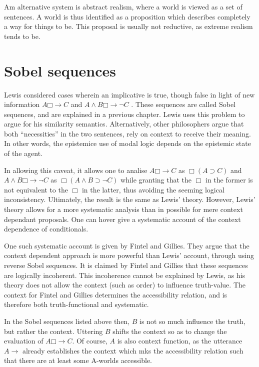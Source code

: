\documentclass[12pt]{report}
\newcommand{\would}{{\mathbin{\Box}{\rightarrow}}}
\begin{document}
Am alternative system is abstract realism, where a world is viewed as a set of
sentences. A world is thus identified as a proposition which describes
completely a way for things to be. This proposal is usually not reductive, as
extreme realism tends to be.

\section{Sobel sequences}

Lewis considered cases wherein an implicative is true, though false in light of
new information $A \would C$ and $A \land B \would \lnot C$ . These sequences
are called Sobel sequences, and are explained in a previous chapter. Lewis uses
this problem to argue for his similarity semantics. Alternatively, other
philosophers argue that both ``necessities'' in the two sentences, rely on
context to receive their meaning. In other words, the epistemice use of modal
logic depends on the epistemic state of the agent.

In allowing this caveat, it allows one to analise $A \would C$ as $\Box (A
\supset C)$ and  $A \land B \would \lnot C$ as $\Box (A \land B \supset \lnot
C)$ while granting that the $\Box$ in the former is not equivalent to the $\Box$
in the latter, thus avoiding the seeming logical inconsistency. Ultimately, the
result is the same as Lewis' theory. However, Lewis' theory allows for a more
systematic analysis than in possible for mere context dependant proposals. One
can hover give a systematic account of the context dependence of conditionals.

One such systematic account is given by Fintel and Gillies. They argue that the
context dependent approach is more powerful than Lewis' account, through using
reverse Sobel sequences. It is claimed by Fintel and Gillies that these
sequences are logically incoherent. This incoherence cannot be explained by
Lewis, as his theory does not allow the context (such as order) to influence
truth-value. The context for Fintel and Gillies determines the accessibility
relation, and is therefore both truth-functional and systematic.

In the Sobel sequences listed above then, $B$ is not so much influence the
truth, but rather the context. Uttering $B$ shifts the context so as to change
the evaluation of $A \would C$. Of course, $A$ is also context function, as the
utterance $A \rightarrow$ already establishes the context which mks the
accessibility relation such that there are at least some A-worlds accessible.
\end{document}
